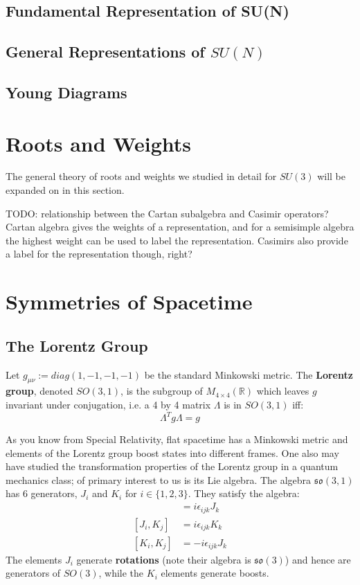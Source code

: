 \documentclass[11pt, oneside]{article}   	%
\theoremstyle{definition}
\begin{document}
\subsection{Fundamental Representation of SU(N)}

\subsection{General Representations of $SU(N)$}

\subsection{Young Diagrams}


\section{Roots and Weights}
\label{sec:weights}

The general theory of roots and weights we studied in detail for $SU(3)$ will be expanded on in this section.

TODO: relationship between the Cartan subalgebra and Casimir operators? Cartan algebra gives the weights of a 
representation, and for a semisimple algebra the highest weight can be used to label the representation. Casimirs 
also provide a label for the representation though, right?

\section{Symmetries of Spacetime}

\subsection{The Lorentz Group}

Let $g_{\mu\nu} := diag(1, -1, -1, -1)$ be the standard Minkowski metric. The \textbf{Lorentz group}, denoted $SO(3, 1)$, is the 
subgroup of $M_{4\times 4}(\mathbb R)$ which leaves $g$ invariant under conjugation, i.e. a 4 by 4 matrix $\Lambda$ is in 
$SO(3, 1)$ iff:
\begin{equation}
	\Lambda^T g\Lambda = g
\end{equation}

As you know from Special Relativity, flat spacetime has a Minkowski metric and elements of the Lorentz group boost states 
into different frames. One also may have studied the transformation properties of the Lorentz group in a quantum mechanics 
class; of primary interest to us is its Lie algebra. The algebra $\mathfrak{so}(3, 1)$ has 6 generators, $J_i$ and $K_i$ for 
$i\in\{1, 2, 3\}$. They satisfy the algebra:
\begin{align}
	[J_i, J_j] &= i\epsilon_{ijk} J_k \nonumber\\
	[J_i, K_j] &= i\epsilon_{ijk} K_k \label{eq:lorentz_algebra} \\
	[K_i, K_j] &= -i\epsilon_{ijk} J_k\nonumber
\end{align}
The elements $J_i$ generate \textbf{rotations} (note their algebra is $\mathfrak{so}(3)$) and hence are generators of 
$SO(3)$, while the $K_i$ elements generate boosts. 
\end{document}
